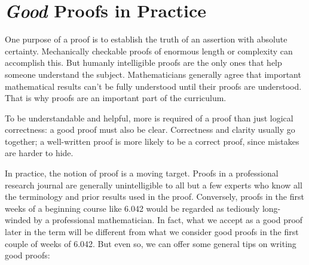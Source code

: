 \fi

\section{\textit{Good} Proofs in Practice}

One purpose of a proof is to establish the truth of an assertion with
absolute certainty.  Mechanically checkable proofs of enormous length or
complexity can accomplish this.  But humanly intelligible proofs are the
only ones that help someone understand the subject.  Mathematicians
generally agree that important mathematical results can't be fully
understood until their proofs are understood.  That is why proofs are an
important part of the curriculum.

To be understandable and helpful, more is required of a proof than just
logical correctness: a good proof must also be clear.  Correctness and
clarity usually go together; a well-written proof is more likely to be a
correct proof, since mistakes are harder to hide.

In practice, the notion of proof is a moving target.  Proofs in a
professional research journal are generally unintelligible to all but a
few experts who know all the terminology and prior results used in the
proof.  Conversely, proofs in the first weeks of a beginning course like
6.042 would be regarded as tediously long-winded by a professional
mathematician.  In fact, what we accept as a good proof later in the term
will be different from what we consider good proofs in the first couple of
weeks of 6.042.  But even so, we can offer some general tips on writing
good proofs:

